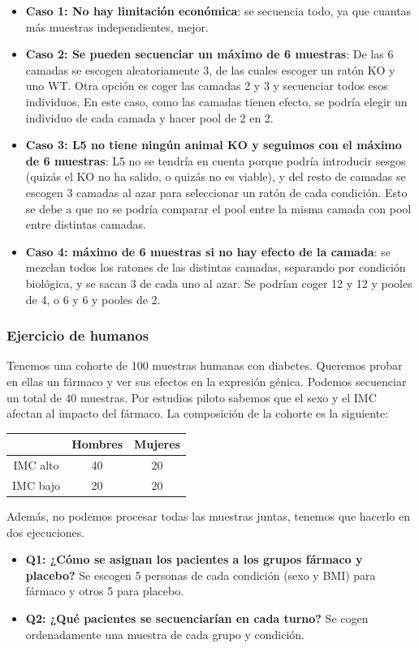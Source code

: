 \begin{itemize}
\item \textbf{Caso 1: No hay limitación económica}: se secuencia todo, ya que cuantas más muestras independientes, mejor.
\item \textbf{Caso 2: Se pueden secuenciar un máximo de 6 muestras}: De las 6 camadas se escogen aleatoriamente 3, de las cuales escoger un ratón KO y uno WT. Otra opción es coger las camadas 2 y 3 y secuenciar todos esos individuos. En este caso, como las camadas tienen efecto, se podría elegir un individuo de cada camada y hacer pool de 2 en 2. 
\item \textbf{Caso 3: L5 no tiene ningún animal KO y seguimos con el máximo de 6 muestras}: L5 no se tendría en cuenta porque podría introducir sesgos (quizás el KO no ha salido, o quizás no es viable), y del resto de camadas se escogen 3 camadas al azar para seleccionar un ratón de cada condición. Esto se debe a que no se podría comparar el pool entre la misma camada con pool entre distintas camadas.
\item \textbf{Caso 4: máximo de 6 muestras si no hay efecto de la camada}: se mezclan todos los ratones de las distintas camadas, separando por condición biológica, y se sacan 3 de cada uno al azar. Se podrían coger 12 y 12 y pooles de 4, o 6 y 6 y pooles de 2.
\end{itemize}

\subsubsection{Ejercicio de humanos}
Tenemos una cohorte de 100 muestras humanas con diabetes. Queremos probar en ellas un fármaco y ver sus efectos en la expresión génica. Podemos secuenciar un total de 40 muestras. Por estudios piloto sabemos que el sexo y el IMC afectan al impacto del fármaco. La composición de la cohorte es la siguiente:
\begin{table}[h]
\centering
\begin{tabular}{c | c c}
 & Hombres & Mujeres \\ \hline
IMC alto & 40 & 20 \\
IMC bajo & 20 & 20
\end{tabular}
\end{table}
Además, no podemos procesar todas las muestras juntas, tenemos que hacerlo en dos ejecuciones.
\begin{itemize}
\item \textbf{Q1: ¿Cómo se asignan los pacientes a los grupos fármaco y placebo?} Se escogen 5 personas de cada condición (sexo y BMI) para fármaco y otros 5 para placebo. 
\item \textbf{Q2: ¿Qué pacientes se secuenciarían en cada turno?} Se cogen ordenadamente una muestra de cada grupo y condición.
\end{itemize}

